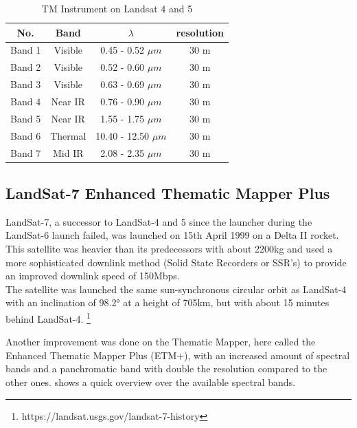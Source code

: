 \begin{table}[h!]
	\centering
	\begin{tabular}{ | c | c | c | c |}
	\hline
	\textbf{No.} & \textbf{Band} & \textbf{$\lambda$} & \textbf{resolution} \\
	\hline
	Band 1 & Visible & 0.45 - 0.52 $\mu m$ & {30 m} \\
	Band 2 & Visible & 0.52 - 0.60 $\mu m$ & {30 m} \\
	Band 3 & Visible & 0.63 - 0.69 $\mu m$ & {30 m} \\
	Band 4 & Near IR & 0.76 - 0.90 $\mu m$ & {30 m} \\
	Band 5 & Near IR & 1.55 - 1.75 $\mu m$ & {30 m} \\
	Band 6 & Thermal & 10.40 - 12.50 $\mu m$ & {30 m} \\
	Band 7 & Mid IR & 2.08 - 2.35 $\mu m$ & {30 m} \\
	\hline
	\end{tabular}
	\caption{TM Instrument on Landsat 4 and 5}
	\label{tab:L45TM}
\end{table}




\subsection{LandSat-7 Enhanced Thematic Mapper Plus}
LandSat-7, a successor to LandSat-4 and 5 since the launcher during the LandSat-6 launch failed, was launched on 15th April 1999 on a Delta II rocket. This satellite was heavier than its predecessors with about 2200kg and used a more sophisticated downlink method (Solid State Recorders or SSR's) to provide an improved downlink speed of 150Mbps.\\
The satellite was launched the same sun-synchronous circular orbit as LandSat-4 with an inclination of 98.2° at a height of 705km, but with about 15 minutes behind LandSat-4. \footnote{https://landsat.usgs.gov/landsat-7-history}

Another improvement was done on the Thematic Mapper, here called the Enhanced Thematic Mapper Plus (ETM+), with an increased amount of spectral bands and a panchromatic band with double the resolution compared to the other ones.  shows a quick overview over the available spectral bands.

